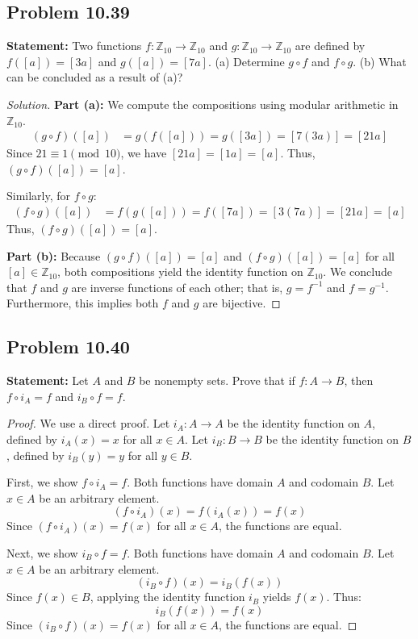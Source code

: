 \documentclass[11pt, a4paper]{article}
\theoremstyle{definition}
\theoremstyle{remark}
\newcommand{\Z}{\mathbb{Z}}
\begin{document}
\subsection*{Problem 10.39}
\textbf{Statement:} Two functions $f: \Z_{10} \to \Z_{10}$ and $g: \Z_{10} \to \Z_{10}$ are defined by $f([a]) = [3a]$ and $g([a]) = [7a]$.
(a) Determine $g \circ f$ and $f \circ g$.
(b) What can be concluded as a result of (a)?

\begin{proof}[Solution]
\textbf{Part (a):} We compute the compositions using modular arithmetic in $\Z_{10}$.
\begin{align*}
    (g \circ f)([a]) &= g(f([a])) = g([3a]) = [7(3a)] = [21a]
\end{align*}
Since $21 \equiv 1 \pmod{10}$, we have $[21a] = [1a] = [a]$. Thus, $(g \circ f)([a]) = [a]$.

Similarly, for $f \circ g$:
\begin{align*}
    (f \circ g)([a]) &= f(g([a])) = f([7a]) = [3(7a)] = [21a] = [a]
\end{align*}
Thus, $(f \circ g)([a]) = [a]$.

\textbf{Part (b):} Because $(g \circ f)([a]) = [a]$ and $(f \circ g)([a]) = [a]$ for all $[a] \in \Z_{10}$, both compositions yield the identity function on $\Z_{10}$. We conclude that $f$ and $g$ are inverse functions of each other; that is, $g = f^{-1}$ and $f = g^{-1}$. Furthermore, this implies both $f$ and $g$ are bijective.
\end{proof}

\subsection*{Problem 10.40}
\textbf{Statement:} Let $A$ and $B$ be nonempty sets. Prove that if $f: A \to B$, then $f \circ i_A = f$ and $i_B \circ f = f$.

\begin{proof}
We use a direct proof. Let $i_A: A \to A$ be the identity function on $A$, defined by $i_A(x) = x$ for all $x \in A$. Let $i_B: B \to B$ be the identity function on $B$, defined by $i_B(y) = y$ for all $y \in B$.

First, we show $f \circ i_A = f$. Both functions have domain $A$ and codomain $B$. Let $x \in A$ be an arbitrary element.
\[ (f \circ i_A)(x) = f(i_A(x)) = f(x) \]
Since $(f \circ i_A)(x) = f(x)$ for all $x \in A$, the functions are equal.

Next, we show $i_B \circ f = f$. Both functions have domain $A$ and codomain $B$. Let $x \in A$ be an arbitrary element.
\[ (i_B \circ f)(x) = i_B(f(x)) \]
Since $f(x) \in B$, applying the identity function $i_B$ yields $f(x)$. Thus:
\[ i_B(f(x)) = f(x) \]
Since $(i_B \circ f)(x) = f(x)$ for all $x \in A$, the functions are equal.
\end{proof}
\end{document}
